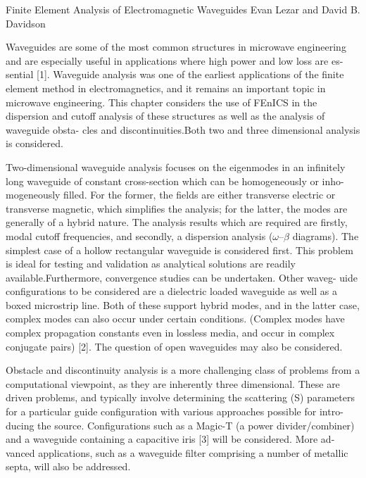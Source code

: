               {Finite Element Analysis of Electromagnetic Waveguides}
              {Evan Lezar and David B. Davidson}

\editornote{[lezar]}

Waveguides are some of the most common structures in microwave
engineering and are especially useful in applications where high power
and low loss are es- sential [1]. Waveguide analysis was one of the
earliest applications of the finite element method in
electromagnetics, and it remains an important topic in microwave
engineering. This chapter considers the use of FEnICS in the
dispersion and cutoff analysis of these structures as well as the
analysis of waveguide obsta- cles and discontinuities.Both two and
three dimensional analysis is considered.

Two-dimensional waveguide analysis focuses on the eigenmodes in an
infinitely long waveguide of constant cross-section which can be
homogeneously or inho- mogeneously filled. For the former, the fields
are either transverse electric or transverse magnetic, which
simplifies the analysis; for the latter, the modes are generally of a
hybrid nature. The analysis results which are required are firstly,
modal cutoff frequencies, and secondly, a dispersion analysis
($\omega$--$\beta$ diagrams).  The simplest case of a hollow
rectangular waveguide is considered first. This problem is ideal for
testing and validation as analytical solutions are readily
available.Furthermore, convergence studies can be undertaken. Other
waveg- uide configurations to be considered are a dielectric loaded
waveguide as well as a boxed microstrip line. Both of these support
hybrid modes, and in the latter case, complex modes can also occur
under certain conditions. (Complex modes have complex propagation
constants even in lossless media, and occur in complex conjugate
pairs) [2]. The question of open waveguides may also be considered.

Obstacle and discontinuity analysis is a more challenging class of
problems from a computational viewpoint, as they are inherently three
dimensional. These are driven problems, and typically involve
determining the scattering (S) parameters for a particular guide
configuration with various approaches possible for intro- ducing the
source. Configurations such as a Magic-T (a power divider/combiner)
and a waveguide containing a capacitive iris [3] will be
considered. More ad- vanced applications, such as a waveguide filter
comprising a number of metallic septa, will also be addressed.

